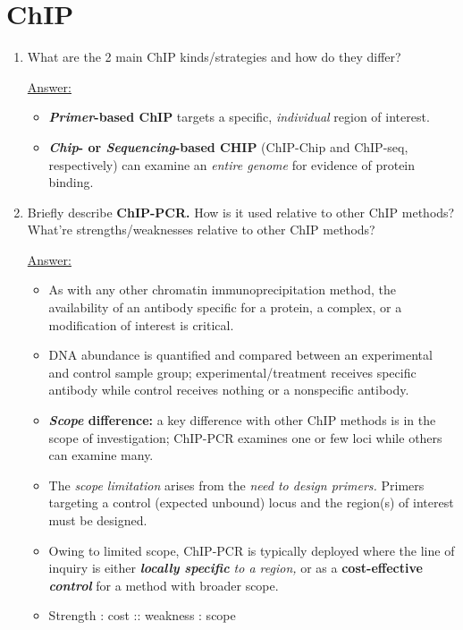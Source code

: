 \documentclass{article}
\newenvironment{QandA}{\begin{enumerate}[label=\bfseries Q\arabic*.]}
                       {\end{enumerate}}
\newenvironment{answered}{\par\normalfont\underline{Answer:}}{}
\begin{document}
\section{ChIP}
\begin{QandA}
  \item{What are the 2 main ChIP kinds/strategies and how do they differ?}
    \begin{answered}
    \begin{itemize}
      \item{\textbf{\textit{Primer}-based ChIP} targets a specific, \textit{individual} region of interest.}
      \item{\textbf{\textit{Chip}- or \textit{Sequencing}-based CHIP} (ChIP-Chip and ChIP-seq, respectively) can examine an \textit{entire genome} for evidence of protein binding.}
    \end{itemize}
    \end{answered}
  \item{Briefly describe \textbf{ChIP-PCR.} How is it used relative to other ChIP methods? What're strengths/weaknesses relative to other ChIP methods?}
    \begin{answered}
    \begin{itemize}
      \item{As with any other chromatin immunoprecipitation method, the availability of an antibody specific for a protein, a complex, or a modification of interest is critical.}
      \item{DNA abundance is quantified and compared between an experimental and control sample group; experimental/treatment receives specific antibody while control receives nothing or a nonspecific antibody.}
      \item{\textbf{\textit{Scope} difference:} a key difference with other ChIP methods is in the scope of investigation; ChIP-PCR examines one or few loci while others can examine many.}
      \item{The \textit{scope limitation} arises from the \textit{need to design primers.} Primers targeting a control (expected unbound) locus and the region(s) of interest must be designed.}
      \item{Owing to limited scope, ChIP-PCR is typically deployed where the line of inquiry is either \textit{\textbf{locally specific} to a region,} or as a \textbf{cost-effective \textit{control}} for a method with broader scope.}
      \item{Strength : cost :: weakness : scope}
    \end{itemize}

\end{answered}
\end{QandA}
\end{document}
